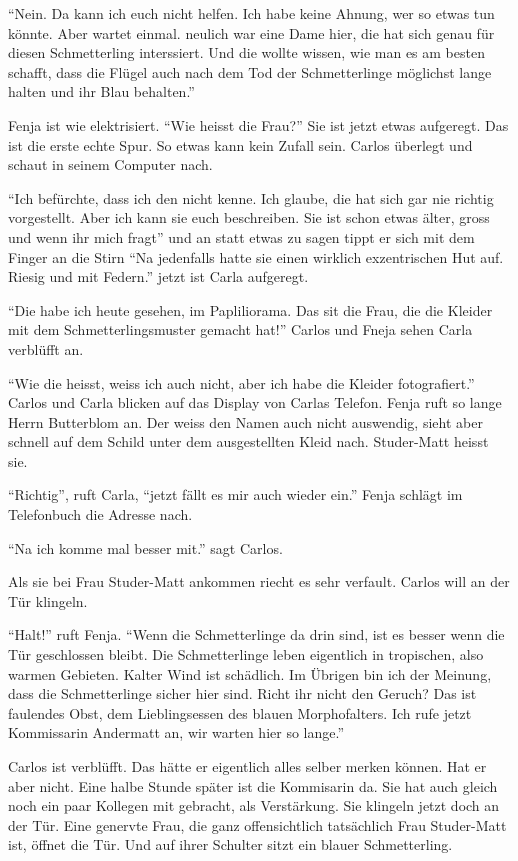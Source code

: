 \enquote{Nein. Da kann ich euch nicht helfen. Ich habe keine Ahnung, wer so etwas tun könnte. Aber wartet einmal. neulich war eine Dame hier, die hat sich genau für diesen Schmetterling interssiert. Und die wollte wissen, wie man es am besten schafft, dass die Flügel auch nach dem Tod der Schmetterlinge möglichst lange halten und ihr Blau behalten.}

Fenja ist wie elektrisiert. \enquote{Wie heisst die Frau?} Sie ist jetzt etwas aufgeregt. Das ist die erste echte Spur. So etwas kann kein Zufall sein. Carlos überlegt und schaut in seinem Computer nach.

\enquote{Ich befürchte, dass ich den nicht kenne. Ich glaube, die hat sich gar nie richtig vorgestellt. Aber ich kann sie euch beschreiben. Sie ist schon etwas älter, gross und wenn ihr mich fragt} und an statt etwas zu sagen tippt er sich mit dem Finger an die Stirn \enquote{Na jedenfalls hatte sie einen wirklich exzentrischen Hut auf. Riesig und mit Federn.} jetzt ist Carla aufgeregt. 

\enquote{Die habe ich heute gesehen, im Papliliorama. Das sit die Frau, die die Kleider mit dem Schmetterlingsmuster gemacht hat!} Carlos und Fneja sehen Carla verblüfft an. 

\enquote{Wie die heisst, weiss ich auch nicht, aber ich habe die Kleider fotografiert.} Carlos und Carla blicken auf das Display von Carlas Telefon. Fenja ruft so lange Herrn Butterblom an. Der weiss den Namen auch nicht auswendig, sieht aber schnell auf dem Schild unter dem ausgestellten Kleid nach. Studer-Matt heisst sie.

\enquote{Richtig}, ruft Carla, \enquote{jetzt fällt es mir auch wieder ein.} Fenja schlägt im Telefonbuch die Adresse nach.

\enquote{Na ich komme mal besser mit.} sagt Carlos.

Als sie bei Frau Studer-Matt ankommen riecht es sehr verfault. Carlos will an der Tür klingeln.

\enquote{Halt!} ruft Fenja. \enquote{Wenn die Schmetterlinge da drin sind, ist es besser wenn die Tür geschlossen bleibt. Die Schmetterlinge leben eigentlich in tropischen, also warmen Gebieten. Kalter Wind ist schädlich. Im Übrigen bin ich der Meinung, dass die Schmetterlinge sicher hier sind. Richt ihr nicht den Geruch? Das ist faulendes Obst, dem Lieblingsessen des blauen Morphofalters. Ich rufe jetzt Kommissarin Andermatt an, wir warten hier so lange.}

Carlos ist verblüfft. Das hätte er eigentlich alles selber merken können. Hat er aber nicht. Eine halbe Stunde später ist die Kommisarin da. Sie hat auch gleich noch ein paar Kollegen mit gebracht, als Verstärkung. Sie klingeln jetzt doch an der Tür. Eine genervte Frau, die ganz offensichtlich tatsächlich Frau Studer-Matt ist, öffnet die Tür. Und auf ihrer Schulter sitzt ein blauer Schmetterling.


